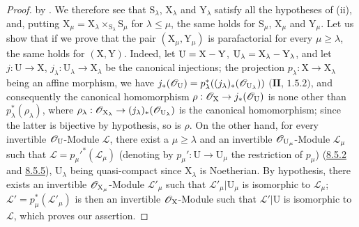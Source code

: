 \begin{proof}
by . We therefore see that $\mathrm{S}_\lambda$, $\mathrm{X}_\lambda$ and $\mathrm{Y}_\lambda$ satisfy all the hypotheses of (ii), and, putting $\mathrm{X}_\mu=\mathrm{X}_\lambda\times_{\mathrm{S}_\lambda}\mathrm{S}_\mu$ for $\lambda\leq\mu$, the same holds for $\mathrm{S}_\mu$, $\mathrm{X}_\mu$ and $\mathrm{Y}_\mu$. Let us show that if we prove that the pair $(\mathrm{X}_\mu,\mathrm{Y}_\mu)$ is parafactorial for every $\mu\geq\lambda$, the same holds for $(\mathrm{X},\mathrm{Y})$. Indeed, let $\mathrm{U}=\mathrm{X}-\mathrm{Y}$, $\mathrm{U}_\lambda=\mathrm{X}_\lambda-\mathrm{Y}_\lambda$, and let $j:\mathrm{U}\to\mathrm{X}$, $j_\lambda:\mathrm{U}_\lambda\to\mathrm{X}_\lambda$ be the canonical injections; the projection $p_\lambda:\mathrm{X}\to\mathrm{X}_\lambda$ being an affine morphism, we have $j_*(\mathscr{O}_{\mathrm{U}})=p_\lambda^*((j_\lambda)_*(\mathscr{O}_{\mathrm{U}_\lambda}))$ $(\mathbf{II}$, $1.5.2)$, and consequently the canonical homomorphism $\rho:\mathscr{O}_{\mathrm{X}}\to j_*(\mathscr{O}_{\mathrm{U}})$ is none other than $p_\lambda^*(\rho_\lambda)$, where $\rho_\lambda:\mathscr{O}_{\mathrm{X}_\lambda}\to(j_\lambda)_*(\mathscr{O}_{\mathrm{U}_\lambda})$ is the canonical homomorphism; since the latter is bijective by hypothesis, so is $\rho$. On the other hand, for every invertible $\mathscr{O}_{\mathrm{U}}$-Module $\mathscr{L}$, there exist a $\mu\geq\lambda$ and an invertible $\mathscr{O}_{\mathrm{U}_\mu}$-Module $\mathscr{L}_\mu$ such that $\mathscr{L}=p_\mu'^*(\mathscr{L}_\mu)$ (denoting by $p_\mu':\mathrm{U}\to\mathrm{U}_\mu$ the restriction of $p_\mu$) (\hyperref[IV.8.5.2]{8.5.2} and \hyperref[IV.8.5.5]{8.5.5}), $\mathrm{U}_\lambda$ being quasi-compact since $\mathrm{X}_\lambda$ is Noetherian. By hypothesis, there exists an invertible $\mathscr{O}_{\mathrm{X}_\mu}$-Module $\mathscr{L}'_\mu$ such that $\mathscr{L}'_\mu|\mathrm{U}_\mu$ is isomorphic to $\mathscr{L}_\mu$; $\mathscr{L}'=p_\mu^*(\mathscr{L}'_\mu)$ is then an invertible $\mathscr{O}_{\mathrm{X}}$-Module such that $\mathscr{L}'|\mathrm{U}$ is isomorphic to $\mathscr{L}$, which proves our assertion.


\end{proof}

